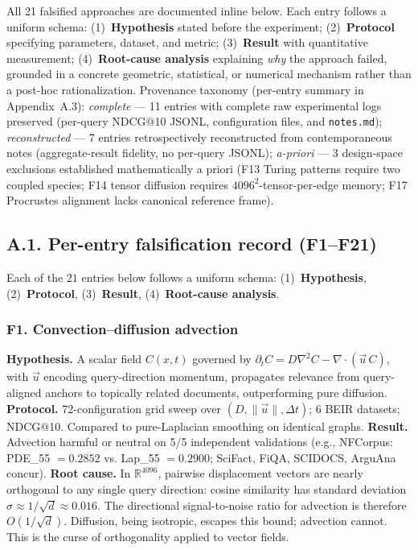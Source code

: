 \documentclass[review,1p,11pt]{elsarticle}
\begin{document}
All 21 falsified approaches are documented inline below. Each entry follows a uniform schema: (1)~\textbf{Hypothesis} stated before the experiment; (2)~\textbf{Protocol} specifying parameters, dataset, and metric; (3)~\textbf{Result} with quantitative measurement; (4)~\textbf{Root-cause analysis} explaining \emph{why} the approach failed, grounded in a concrete geometric, statistical, or numerical mechanism rather than a post-hoc rationalization. Provenance taxonomy (per-entry summary in Appendix~A.3): \emph{complete} — 11 entries with complete raw experimental logs preserved (per-query NDCG@10 JSONL, configuration files, and \texttt{notes.md}); \emph{reconstructed} — 7 entries retrospectively reconstructed from contemporaneous notes (aggregate-result fidelity, no per-query JSONL); \emph{a-priori} — 3 design-space exclusions established mathematically a priori (F13 Turing patterns require two coupled species; F14 tensor diffusion requires $4096^2$-tensor-per-edge memory; F17 Procrustes alignment lacks canonical reference frame).

\subsection*{A.1. Per-entry falsification record (F1--F21)}

Each of the $21$ entries below follows a uniform schema: (1)~\textbf{Hypothesis}, (2)~\textbf{Protocol}, (3)~\textbf{Result}, (4)~\textbf{Root-cause analysis}.

\subsubsection*{F1. Convection--diffusion advection}
\textbf{Hypothesis.} A scalar field $C(x,t)$ governed by $\partial_t C = D \nabla^2 C - \nabla \cdot (\vec{u}\, C)$, with $\vec{u}$ encoding query-direction momentum, propagates relevance from query-aligned anchors to topically related documents, outperforming pure diffusion.
\textbf{Protocol.} 72-configuration grid sweep over $(D, \|\vec{u}\|, \Delta t)$; 6 BEIR datasets; NDCG@10. Compared to pure-Laplacian smoothing on identical graphs.
\textbf{Result.} Advection harmful or neutral on 5/5 independent validations (e.g., NFCorpus: PDE\_55 $=0.2852$ vs. Lap\_55 $=0.2900$; SciFact, FiQA, SCIDOCS, ArguAna concur).
\textbf{Root cause.} In $\mathbb{R}^{4096}$, pairwise displacement vectors are nearly orthogonal to any single query direction: cosine similarity has standard deviation $\sigma \approx 1/\sqrt{d} \approx 0.016$. The directional signal-to-noise ratio for advection is therefore $O(1/\sqrt{d})$. Diffusion, being isotropic, escapes this bound; advection cannot. This is the curse of orthogonality applied to vector fields.
\end{document}
